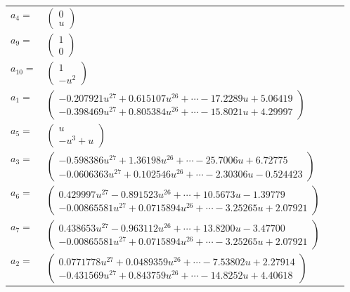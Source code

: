 \documentclass[1p]{elsarticle_modified}
\theoremstyle{definition}
\begin{document}
\begin{tabular}{m{7pt} m{180pt} m{7pt} m{180pt} }
\flushright $a_{4}=$&$\begin{pmatrix}0\\u\end{pmatrix}$ \\
\flushright $a_{9}=$&$\begin{pmatrix}1\\0\end{pmatrix}$ \\
\flushright $a_{10}=$&$\begin{pmatrix}1\\- u^2\end{pmatrix}$ \\
\flushright $a_{1}=$&$\begin{pmatrix}-0.207921 u^{27}+0.615107 u^{26}+\cdots-17.2289 u+5.06419\\-0.398469 u^{27}+0.805384 u^{26}+\cdots-15.8021 u+4.29997\end{pmatrix}$ \\
\flushright $a_{5}=$&$\begin{pmatrix}u\\- u^3+u\end{pmatrix}$ \\
\flushright $a_{3}=$&$\begin{pmatrix}-0.598386 u^{27}+1.36198 u^{26}+\cdots-25.7006 u+6.72775\\-0.0606363 u^{27}+0.102546 u^{26}+\cdots-2.30306 u-0.524423\end{pmatrix}$ \\
\flushright $a_{6}=$&$\begin{pmatrix}0.429997 u^{27}-0.891523 u^{26}+\cdots+10.5673 u-1.39779\\-0.00865581 u^{27}+0.0715894 u^{26}+\cdots-3.25265 u+2.07921\end{pmatrix}$ \\
\flushright $a_{7}=$&$\begin{pmatrix}0.438653 u^{27}-0.963112 u^{26}+\cdots+13.8200 u-3.47700\\-0.00865581 u^{27}+0.0715894 u^{26}+\cdots-3.25265 u+2.07921\end{pmatrix}$ \\
\flushright $a_{2}=$&$\begin{pmatrix}0.0771778 u^{27}+0.0489359 u^{26}+\cdots-7.53802 u+2.27914\\-0.431569 u^{27}+0.843759 u^{26}+\cdots-14.8252 u+4.40618\end{pmatrix}$ \\

\end{tabular}
\end{document}
